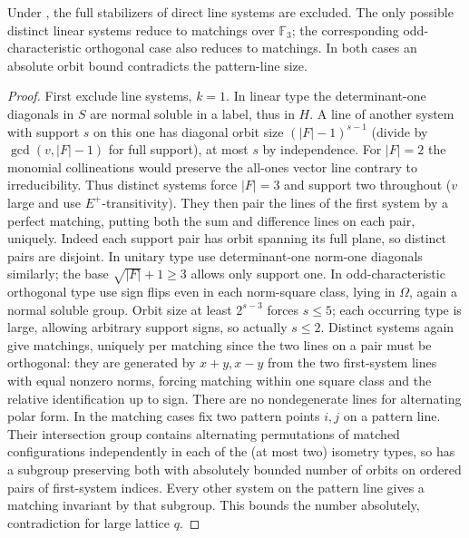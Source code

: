 \begin{lemma}\label{c:direct-lines}
Under , the full stabilizers of direct line systems are excluded. The only possible distinct linear systems reduce to matchings over \(\mathbb F_3\); the corresponding odd-characteristic orthogonal case also reduces to matchings. In both cases an absolute orbit bound contradicts the pattern-line size.
\end{lemma}

\begin{proof}
First exclude line systems, \(k=1\). In linear type the determinant-one diagonals in \(S\) are normal soluble in a label, thus in \(H\). A line of another system with support \(s\) on this one has diagonal orbit size \((|F|-1)^{s-1}\) (divide by \(\gcd(v,|F|-1)\) for full support), at most \(s\) by independence. For \(|F|=2\) the monomial collineations would preserve the all-ones vector line contrary to irreducibility. Thus distinct systems force \(|F|=3\) and support two throughout (\(v\) large and use \(E^+\)-transitivity). They then pair the lines of the first system by a perfect matching, putting both the sum and difference lines on each pair, uniquely. Indeed each support pair has orbit spanning its full plane, so distinct pairs are disjoint. In unitary type use determinant-one norm-one diagonals similarly; the base \(\sqrt{|F|}+1\ge3\) allows only support one. In odd-characteristic orthogonal type use sign flips even in each norm-square class, lying in \(\Omega\), again a normal soluble group. Orbit size at least \(2^{s-3}\) forces \(s\le5\); each occurring type is large, allowing arbitrary support signs, so actually \(s\le2\). Distinct systems again give matchings, uniquely per matching since the two lines on a pair must be orthogonal: they are generated by \(x+y,x-y\) from the two first-system lines with equal nonzero norms, forcing matching within one square class and the relative identification up to sign. There are no nondegenerate lines for alternating polar form. In the matching cases fix two pattern points \(i,j\) on a pattern line. Their intersection group contains alternating permutations of matched configurations independently in each of the (at most two) isometry types, so has a subgroup preserving both with absolutely bounded number of orbits on ordered pairs of first-system indices. Every other system on the pattern line gives a matching invariant by that subgroup. This bounds the number absolutely, contradiction for large lattice \(q\).
\end{proof}

